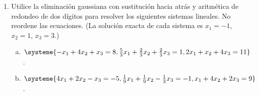 \documentclass[
	spanish,
	8pt,
	utf8,
	xcolor=table,
	handout,
	aspectratio=169,
	professionalfonts,
	notheorems,
	mathserif,
]{beamer}
\newcounter{savedenum}
\newcommand*{\saveenum}{\setcounter{savedenum}{\theenumi}}
\begin{document}
\begin{frame}
\begin{enumerate}
		\item

		      Utilice la eliminación gaussiana con sustitución hacia
		      atrás y aritmética de redondeo de dos dígitos para
		      resolver los siguientes sistemas lineales.
		      No reordene las ecuaciones.
		      (La solución exacta de cada sistema es $x_{1}=-1$, $x_{2}=1$, $x_{3}=3$.)

		      \begin{multicols}{2}
			      \begin{enumerate}[a)]
				      \item

				            \begin{math}
					            \systeme{
					            -x_{1}+
					            4x_{2}+
					            x_{3}=
					            8,
					            \frac{5}{3}x_{1}+
					            \frac{2}{3}x_{2}+
					            \frac{2}{3}x_{3}=
					            1,
					            2x_{1}+
					            x_{2}+
					            4x_{3}=
					            11
					            }
				            \end{math}.

				      \item


				            \begin{math}
					            \systeme{
					            4x_{1}+
					            2x_{2}-
					            x_{3}=
					            -5,
					            \frac{1}{9}x_{1}+
					            \frac{1}{9}x_{2}-
					            \frac{1}{3}x_{3}=
					            -1,
					            x_{1}+
					            4x_{2}+
					            2x_{3}=
					            9
					            }
				            \end{math}.
			      \end{enumerate}
		      \end{multicols}
		      \saveenum
	\end{enumerate}
\end{frame}
\end{document}
